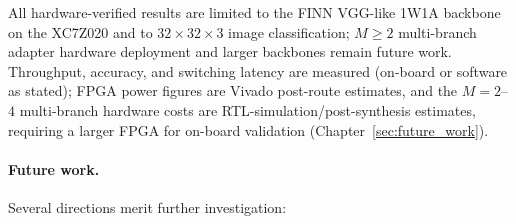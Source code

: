 \documentclass[12pt, a4paper]{report}
\numberwithin{equation}{chapter}
\numberwithin{figure}{chapter}
\numberwithin{table}{chapter}
\numberwithin{algorithm}{chapter}
\begin{document}
All hardware-verified results are limited to the FINN VGG-like 1W1A backbone on the XC7Z020 and to $32{\times}32{\times}3$ image classification; $M{\geq}2$ multi-branch adapter hardware deployment and larger backbones remain future work.
Throughput, accuracy, and switching latency are measured (on-board or software as stated); FPGA power figures are Vivado post-route estimates, and the $M{=}2$--$4$ multi-branch hardware costs are RTL-simulation/post-synthesis estimates, requiring a larger FPGA for on-board validation (Chapter~\ref{sec:future_work}).

\paragraph{Future work.}

Several directions merit further investigation:
\end{document}
